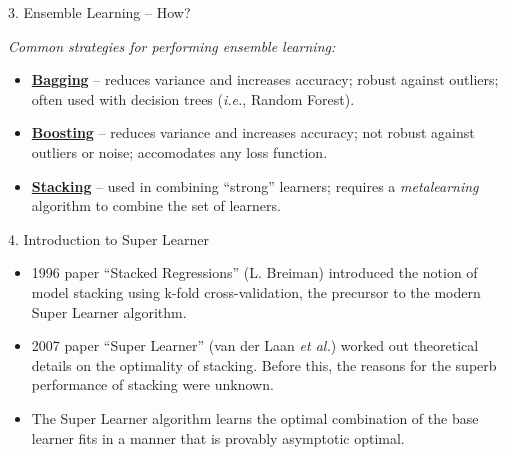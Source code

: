 \documentclass[12pt,t,handout]{beamer}
\begin{document}
\begin{frame}[c]{3. Ensemble Learning -- How?}

\vspace*{3mm}

\textit{Common strategies for performing ensemble learning:}

\vspace{1em}

\centering

  \begin{itemize}
    \itemsep12pt
    \item \underline{\textbf{Bagging}} -- reduces variance and increases
          accuracy; robust against outliers; often used with decision trees
          (\textit{i.e.}, Random Forest).
    \item \underline{\textbf{Boosting}} -- reduces variance and increases
          accuracy; not robust against outliers or noise; accomodates any loss
          function.
    \item \underline{\textbf{Stacking}} -- used in combining ``strong''
          learners; requires a \textit{metalearning} algorithm to combine the
          set of learners.
  \end{itemize}

\end{frame}


\begin{frame}[c]{4. Introduction to Super Learner}

\vspace*{3mm}

\centering

  \begin{itemize}
    \itemsep12pt
    \item 1996 paper ``Stacked Regressions'' (L. Breiman) introduced the notion
          of model stacking using k-fold cross-validation, the precursor to the
          modern Super Learner algorithm.
    \item 2007 paper ``Super Learner'' (van der Laan \textit{et al.}) worked out
          theoretical details on the optimality of stacking. Before this, the
          reasons for the superb performance of stacking were unknown.
    \item The Super Learner algorithm learns the optimal combination of the
          base learner fits in a manner that is provably asymptotic optimal.
  \end{itemize}

\end{frame}
\end{document}
